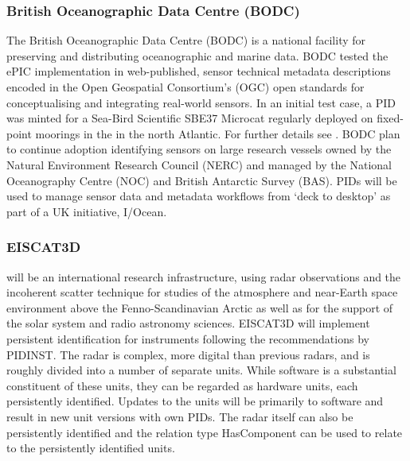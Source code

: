 \documentclass[a4paper,10pt,english]{sphinxmanual}
\begin{document}
\subsubsection{British Oceanographic Data Centre (BODC)}
\label{\detokenize{white-paper/adoption:british-oceanographic-data-centre-bodc}}
The British Oceanographic Data Centre (BODC) is a national facility for
preserving and distributing oceanographic and marine data. BODC tested
the ePIC implementation in web-published, sensor technical metadata
descriptions encoded in the Open Geospatial Consortium’s (OGC)
 open standards for conceptualising and integrating
real-world sensors. In an initial test case, a PID was minted for a
Sea-Bird Scientific SBE37 Microcat regularly deployed on fixed-point
moorings in the  in the north Atlantic. For further details see
{\hyperref[\detokenize{white-paper/landing-page-encoding:landing-page-encoding-swe}]{}}. BODC plan to continue adoption
identifying sensors on large research vessels owned by the Natural
Environment Research Council (NERC) and managed by the National
Oceanography Centre (NOC) and British Antarctic Survey (BAS). PIDs will
be used to manage sensor data and metadata workflows from ‘deck to
desktop’ as part of a UK initiative, I/Ocean.


\subsubsection{EISCAT3D}
\label{\detokenize{white-paper/adoption:eiscat3d}}
 will be an international research infrastructure, using
radar observations and the incoherent scatter technique for studies of
the atmosphere and near-Earth space environment above the
Fenno-Scandinavian Arctic as well as for the support of the solar system
and radio astronomy sciences. EISCAT3D will implement persistent
identification for instruments following the recommendations by PIDINST.
The radar is complex, more digital than previous radars, and is roughly
divided into a number of separate units. While software is a substantial
constituent of these units, they can be regarded as hardware units, each
persistently identified. Updates to the units will be primarily to
software and result in new unit versions with own PIDs. The radar itself
can also be persistently identified and the relation type HasComponent
can be used to relate to the persistently identified units.
\end{document}
